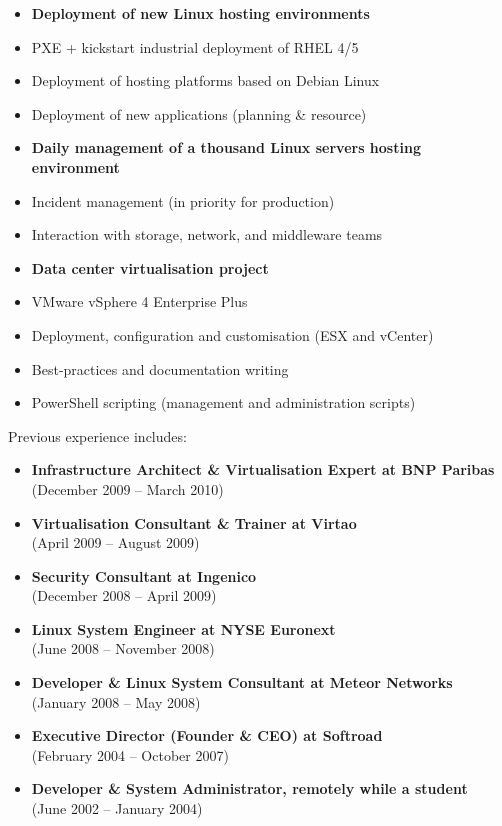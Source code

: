 \documentclass[10pt,a4paper]{altacv}
\begin{document}
\clearpage

\begin{itemize}
\item \textbf{Deployment of new Linux hosting environments}
\setlength{\itemindent}{.2in}
\item PXE + kickstart industrial deployment of RHEL 4/5
\item Deployment of hosting platforms based on Debian Linux
\item Deployment of new applications (planning \& resource)
\setlength{\itemindent}{0in}
\item \textbf{Daily management of a thousand Linux servers hosting environment}
\setlength{\itemindent}{.2in}
\item Incident management (in priority for production)
\item Interaction with storage, network, and middleware teams
\setlength{\itemindent}{0in}
\item \textbf{Data center virtualisation project}
\setlength{\itemindent}{.2in}
\item VMware vSphere 4 Enterprise Plus
\item Deployment, configuration and customisation (ESX and vCenter)
\item Best-practices and documentation writing
\item PowerShell scripting (management and administration scripts)
\end{itemize}

\divider

Previous experience includes:
\smallskip
\begin{itemize}
\item \textbf{Infrastructure Architect \& Virtualisation Expert at BNP Paribas}\\
		(December 2009 -- March 2010)
\item \textbf{Virtualisation Consultant \& Trainer at Virtao}\\
		(April 2009 -- August 2009)
\item \textbf{Security Consultant at Ingenico}\\
		(December 2008 -- April 2009)
\item \textbf{Linux System Engineer at NYSE Euronext}\\
		(June 2008 -- November 2008)
\item \textbf{Developer \& Linux System Consultant at Meteor Networks}\\
		(January 2008 -- May 2008)
\item \textbf{Executive Director (Founder \& CEO) at Softroad}\\
		(February 2004 -- October 2007)
\item \textbf{Developer \& System Administrator, remotely while a student}\\
		(June 2002 -- January 2004)
\end{itemize}
\end{document}
